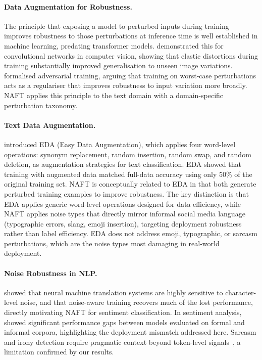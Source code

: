 \documentclass[sigconf]{acmart}
\begin{document}
\paragraph{Data Augmentation for Robustness.}
The principle that exposing a model to perturbed inputs during
training improves robustness to those perturbations at inference
time is well established in machine learning, predating
transformer models.
\citet{simard2003best} demonstrated this for convolutional networks
in computer vision, showing that elastic distortions during training
substantially improved generalisation to unseen image variations.
\citet{goodfellow2015explaining} formalised adversarial training,
arguing that training on worst-case perturbations acts as a
regulariser that improves robustness to input variation more
broadly.
NAFT applies this principle to the text domain with a
domain-specific perturbation taxonomy.

\paragraph{Text Data Augmentation.}
\citet{wei2019eda} introduced EDA (Easy Data Augmentation), which
applies four word-level operations: synonym replacement, random
insertion, random swap, and random deletion, as augmentation
strategies for text classification.
EDA showed that training with augmented data matched full-data
accuracy using only 50\% of the original training set.
NAFT is conceptually related to EDA in that both generate
perturbed training examples to improve robustness.
The key distinction is that EDA applies generic word-level
operations designed for data efficiency, while NAFT applies
noise types that directly mirror informal social media language
(typographic errors, slang, emoji insertion), targeting deployment
robustness rather than label efficiency.
EDA does not address emoji, typographic, or sarcasm perturbations,
which are the noise types most damaging in real-world deployment.

\paragraph{Noise Robustness in NLP.}
\citet{belinkov2018synthetic} showed that neural machine translation
systems are highly sensitive to character-level noise, and that
noise-aware training recovers much of the lost performance,
directly motivating NAFT for sentiment classification.
In sentiment analysis, \citet{barbieri2020tweeteval} showed
significant performance gaps between models evaluated on formal and
informal corpora, highlighting the deployment mismatch addressed
here.
Sarcasm and irony detection require pragmatic context beyond
token-level signals~\cite{van2018semeval}, a limitation confirmed
by our results.
\end{document}
